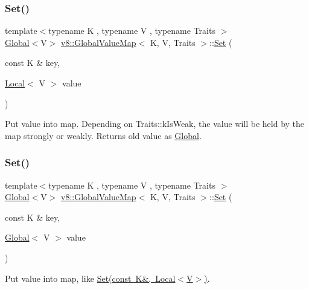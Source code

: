 \subsubsection{\texorpdfstring{Set()}{Set()}\hspace{0.1cm}{\footnotesize\ttfamily [1/3]}}
{\footnotesize\ttfamily template$<$typename K , typename V , typename Traits $>$ \\
\mbox{\hyperlink{classv8_1_1Global}{Global}}$<$V$>$ \mbox{\hyperlink{classv8_1_1GlobalValueMap}{v8\+::\+Global\+Value\+Map}}$<$ K, V, Traits $>$\+::\mbox{\hyperlink{classv8_1_1Set}{Set}} (\begin{DoxyParamCaption}\item[{const K \&}]{key,  }\item[{\mbox{\hyperlink{classv8_1_1Local}{Local}}$<$ V $>$}]{value }\end{DoxyParamCaption})\hspace{0.3cm}{\ttfamily [inline]}}

Put value into map. Depending on Traits\+::k\+Is\+Weak, the value will be held by the map strongly or weakly. Returns old value as \mbox{\hyperlink{classv8_1_1Global}{Global}}. \mbox{\label{classv8_1_1GlobalValueMap_ac2b02a0105393e6e3ab7e0aeeed9a294}} 
\subsubsection{\texorpdfstring{Set()}{Set()}\hspace{0.1cm}{\footnotesize\ttfamily [2/3]}}
{\footnotesize\ttfamily template$<$typename K , typename V , typename Traits $>$ \\
\mbox{\hyperlink{classv8_1_1Global}{Global}}$<$V$>$ \mbox{\hyperlink{classv8_1_1GlobalValueMap}{v8\+::\+Global\+Value\+Map}}$<$ K, V, Traits $>$\+::\mbox{\hyperlink{classv8_1_1Set}{Set}} (\begin{DoxyParamCaption}\item[{const K \&}]{key,  }\item[{\mbox{\hyperlink{classv8_1_1Global}{Global}}$<$ V $>$}]{value }\end{DoxyParamCaption})\hspace{0.3cm}{\ttfamily [inline]}}

Put value into map, like \mbox{\hyperlink{classv8_1_1GlobalValueMap_aa13f7914642c705b8e96824747ea115a}{Set(const K\&, Local$<$\+V$>$)}}. \mbox{\label{classv8_1_1GlobalValueMap_aaa5fa26f751c8608716ad5578cd6c1d0}} 
